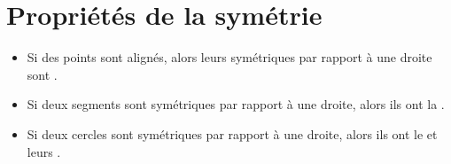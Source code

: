 \documentclass[12pt,a4paper]{article}
\begin{document}
\section{Propriétés de la symétrie}

	\begin{myprops}
		\begin{itemize}
			\item Si des points sont alignés, alors leurs symétriques par rapport à une droite sont .
			\item Si deux segments sont symétriques par rapport à une droite, alors ils ont la .
			\item Si deux cercles sont symétriques par rapport à une droite, alors ils ont le  et leurs .
		\end{itemize}
		
	\end{myprops}
\end{document}
